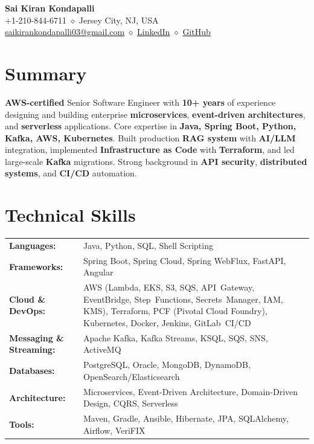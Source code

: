 \documentclass[11pt,a4paper]{article}
\newcommand{\resumeHeader}[4]{
    \begin{center}
        {\Huge\bfseries #1}\\[0.3cm]
        #2 \quad $\diamond$ \quad #3\\[0.15cm]
        #4
    \end{center}
}
\begin{document}

\resumeHeader{Sai Kiran Kondapalli}
{+1-210-844-6711}
{Jersey City, NJ, USA}
{\href{mailto:saikirankondapalli03@gmail.com}{saikirankondapalli03@gmail.com} \quad $\diamond$ \quad \href{https://www.linkedin.com/in/saikirankondapalli}{LinkedIn} \quad $\diamond$ \quad \href{https://github.com/saikirankondapalli}{GitHub}}

\section{Summary}
\small\raggedright{\textbf{AWS-certified} Senior Software Engineer with \textbf{10+ years} of experience designing and building enterprise \textbf{microservices}, \textbf{event-driven architectures}, and \textbf{serverless} applications. Core expertise in \textbf{Java, Spring Boot, Python, Kafka, AWS, Kubernetes}. Built production \textbf{RAG system} with \textbf{AI/LLM} integration, implemented \textbf{Infrastructure as Code} with \textbf{Terraform}, and led large-scale \textbf{Kafka} migrations. Strong background in \textbf{API security}, \textbf{distributed systems}, and \textbf{CI/CD} automation.}

\section{Technical Skills}
\renewcommand{\arraystretch}{1.1}
\begin{tabularx}{\textwidth}{@{}lX@{}}
    \textbf{Languages:} & Java, Python, SQL, Shell Scripting\\
    \textbf{Frameworks:} & Spring Boot, Spring Cloud, Spring WebFlux, FastAPI, Angular\\
    \textbf{Cloud \& DevOps:} & AWS (Lambda, EKS, S3, SQS, API~Gateway, EventBridge, Step~Functions, Secrets~Manager, IAM, KMS), Terraform, PCF (Pivotal Cloud Foundry), Kubernetes, Docker, Jenkins, GitLab~CI/CD\\
    \textbf{Messaging \& Streaming:} & Apache Kafka, Kafka Streams, KSQL, SQS, SNS, ActiveMQ\\
    \textbf{Databases:} & PostgreSQL, Oracle, MongoDB, DynamoDB, OpenSearch/Elasticsearch\\
    \textbf{Architecture:} & Microservices, Event-Driven Architecture, Domain-Driven Design, CQRS, Serverless\\
    \textbf{Tools:} & Maven, Gradle, Ansible, Hibernate, JPA, SQLAlchemy, Airflow, VeriFIX\\
\end{tabularx}
\renewcommand{\arraystretch}{1}
\end{document}
